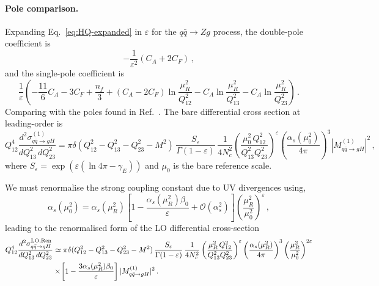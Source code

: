 \paragraph{Pole comparison.} Expanding Eq.~\eqref{eq:HQ-expanded} in $\varepsilon$ for the
$q\bar{q}\to Zg$ process, the double-pole
coefficient is
\begin{equation}
  \label{eq:H-pole2}
  -\frac{1}{\varepsilon^2}(C_A+2C_F)\,,
\end{equation}
and the single-pole coefficient is
\begin{equation}
  \label{eq:H-pole1}
  \frac{1}{\varepsilon}\!\left(
  -\frac{11}{6}C_A-3C_F+\frac{n_f}{3}
  +(C_A-2C_F)\ln\frac{\mu_R^2}{Q_{12}^2}
  -C_A\ln\frac{\mu_R^2}{Q_{13}^2}
  -C_A\ln\frac{\mu_R^2}{Q_{23}^2}
  \right)\,.
\end{equation}
Comparing with the poles found in Ref.~\cite{Ravindran:2002dc}. The bare differential cross section at leading-order is
\begin{equation}
  Q_{12}^4\frac{d^2\sigma_{q\bar{q}\to g H}^{(1)}}{dQ_{13}^2\,dQ_{23}^2} =
  \pi\delta(Q_{12}^2-Q_{13}^2-Q_{23}^2-M^2)\,
  \frac{S_\varepsilon}{\Gamma(1-\varepsilon)}
  \,\frac{1}{4N_c^2}
  \left(\frac{\mu_0^2\,Q_{12}^2}{Q_{13}^2Q_{23}^2}\right)^\varepsilon
 \left( \frac{\alpha_s(\mu_0^2)}{4\pi}\right)^3|M_{q\bar{q}\to g H}^{(1)}|^2
  \,,
\end{equation}
where $S_\varepsilon=\exp(\varepsilon(\ln4\pi-\gamma_E))$ and $\mu_0$ is the bare reference scale. 

We must renormalise the strong coupling constant due to UV divergences using,
\begin{equation}
  \label{eq:Catani-renorm}
  \alpha_s(\mu_0^2) =
\alpha_s(\mu_R^2)
  \!\left[1-\frac{\alpha_s(\mu_R^2)\beta_0}{\varepsilon}
  +\mathcal{O}(\alpha_s^2)\right] \left(\frac{\mu_R^2}{\mu_0^2}\right)^\varepsilon\,,
\end{equation}
leading to the renormalised form of the LO differential cross-section
\begin{equation}
\begin{aligned}
  \label{eq:LO-ren}
  Q_{12}^4\frac{d^2\sigma_{q\bar{q}\to gH}^{{\rm LO},\rm Ren}}{dQ_{13}^2\,dQ_{23}^2}& \simeq
  \pi\delta(Q_{12}^2-Q_{13}^2-Q_{23}^2-M^2)\,
  \frac{S_\varepsilon}{\Gamma(1-\varepsilon)}
  \,\frac{1}{4N_c^2}
  \left(\frac{\mu_R^2\,Q_{12}^2}{Q_{13}^2Q_{23}^2}\right)^\varepsilon
\left(\frac{\alpha_s(\mu_R^2)}{4\pi}\right)^3
\left(\frac{\mu_R^2}{\mu_0^2}\right)^{2\varepsilon}\\
&\times  \!\left[1-\frac{3\alpha_s(\mu_R^2)\beta_0}{\varepsilon}\right] |M_{q\bar{q}\to gH}^{(1)}|^2\,.
  \end{aligned}
  \end{equation}
 
